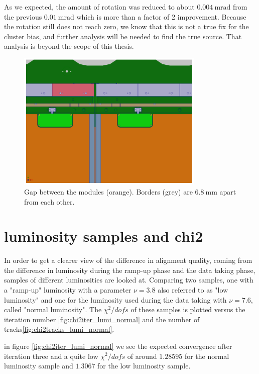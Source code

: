 As we expected, the amount of rotation was reduced to about
$\SI{0.004}{\milli\radian}$ from the previous $\SI{0.01}{\milli\radian}$ which is more than a factor of 2 improvement. Because the rotation still does not reach zero, we know that this is not a true fix for the cluster bias, and further analysis will be needed to find the true source. That analysis is beyond the scope of this thesis.

\begin{figure}
    \centering
    \includegraphics[width=0.8\textwidth]{plots/module_gap.png}
    \caption{Gap between the modules (orange). Borders (grey) are $\SI{6.8}{\milli\metre}$ apart from each other.}
    \label{fig:module_gap}
\end{figure}

\section{luminosity samples and chi2}
In order to get a clearer view of the difference in alignment quality, coming from the difference in luminosity during the ramp-up phase and the data taking phase, samples of different luminosities are looked at.
Comparing two samples, one with a "ramp-up" luminosity with a parameter $\nu = 3.8$ also referred to as "low luminosity" and one for the luminosity used during the data taking
with $\nu = 7.6$, called "normal luminosity".
The $\chi^2 / dofs$ of these samples is plotted versus the iteration number \ref{fig:chi2iter_lumi_normal} and the number of tracks\ref{fig:chi2tracks_lumi_normal}.

in figure \ref{fig:chi2iter_lumi_normal} we see the expected convergence after iteration three and a quite low $\chi^2 / dofs$ of around $\num{1.28595}$ for the normal luminosity sample
and $\num{1.3067}$ for the low luminosity sample.

